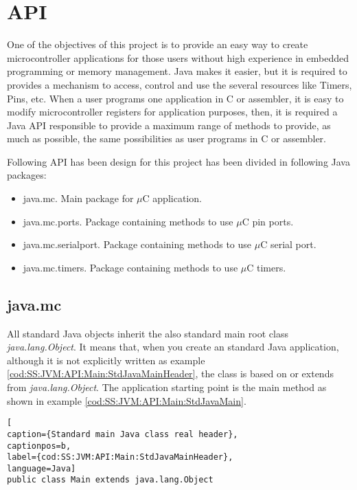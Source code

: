 \section{API}\label{S:JVM:API}
One of the objectives of this project is to provide an easy way to create microcontroller applications for those users without high experience in embedded programming or memory management. Java makes it easier, but it is required to provides a mechanism to access, control and use the several resources like Timers, Pins, etc. When a user programs one application in C or assembler, it is easy to modify microcontroller registers for application purposes, then, it is required a Java API responsible to provide a maximum range of methods to provide, as much as possible, the same possibilities as user programs in C or assembler.

Following API has been design for this project has been divided in following Java packages:

\begin{itemize}
\item java.mc. Main package for $\mu$C application.
\item java.mc.ports. Package containing methods to use $\mu$C pin ports.
\item java.mc.serialport. Package containing methods to use $\mu$C serial port.
\item java.mc.timers. Package containing methods to use $\mu$C timers.
\end{itemize}

\subsection{java.mc}\label{SS:JVM:API:Main}
All standard Java objects inherit the also standard main root class \textit{java.lang.Object}. It means that, when you create an standard Java application, although it is not explicitly written as example \ref{cod:SS:JVM:API:Main:StdJavaMainHeader}, the class is based on or extends from \textit{java.lang.Object}. The application starting point is the main method as shown in example \ref{cod:SS:JVM:API:Main:StdJavaMain}.

\medskip
\begin{lstlisting}[
caption={Standard main Java class real header},
captionpos=b,
label={cod:SS:JVM:API:Main:StdJavaMainHeader},
language=Java]
public class Main extends java.lang.Object
\end{lstlisting}
\medskip

